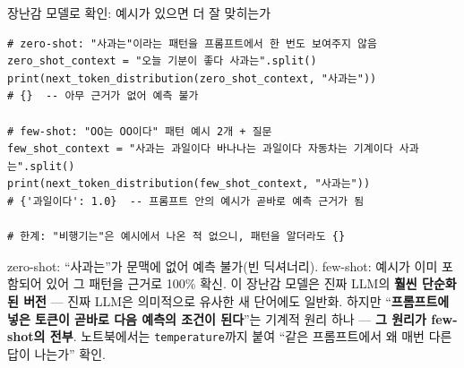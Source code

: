 \documentclass[aspectratio=169,11pt]{beamer}
\begin{document}

\begin{frame}[fragile]{장난감 모델로 확인: 예시가 있으면 더 잘 맞히는가}
\begin{lstlisting}
# zero-shot: "사과는"이라는 패턴을 프롬프트에서 한 번도 보여주지 않음
zero_shot_context = "오늘 기분이 좋다 사과는".split()
print(next_token_distribution(zero_shot_context, "사과는"))
# {}  -- 아무 근거가 없어 예측 불가

# few-shot: "OO는 OO이다" 패턴 예시 2개 + 질문
few_shot_context = "사과는 과일이다 바나나는 과일이다 자동차는 기계이다 사과는".split()
print(next_token_distribution(few_shot_context, "사과는"))
# {'과일이다': 1.0}  -- 프롬프트 안의 예시가 곧바로 예측 근거가 됨

# 한계: "비행기는"은 예시에서 나온 적 없으니, 패턴을 알더라도 {}
\end{lstlisting}
  {\footnotesize zero-shot: ``사과는''가 문맥에 없어 예측
  불가(빈 딕셔너리). few-shot: 예시가 이미 포함되어 있어
  그 패턴을 근거로 100\% 확신.
  이 장난감 모델은 진짜 LLM의 \textbf{훨씬 단순화된 버전}
  --- 진짜 LLM은 의미적으로 유사한 새 단어에도 일반화.
  하지만 ``\textbf{프롬프트에 넣은 토큰이 곧바로 다음
  예측의 조건이 된다}''는 기계적 원리 하나 --- \textbf{그
  원리가 few-shot의 전부}. 노트북에서는
  \texttt{temperature}까지 붙여 ``같은 프롬프트에서 왜 매번
  다른 답이 나는가'' 확인.}
\end{frame}
\end{document}
